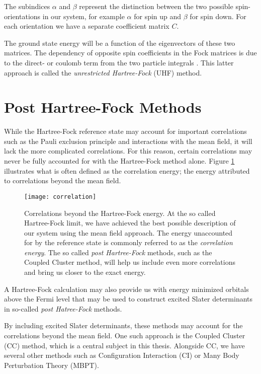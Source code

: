 The subindices $\alpha$ and $\beta$ represent the distinction between the two possible spin-orientations in our system, for example $\alpha$ for spin up and $\beta$ for spin down. For each orientation we have a separate coefficient matrix $C$.

The ground state energy will be a function of the eigenvectors of
these two matrices. The dependency of opposite spin coefficients in
the Fock matrices is due to the direct- or coulomb term from the two
particle integrals \cite[p.241]{Szabo}. This latter approach is called
the \emph{unrestricted Hartree-Fock} (UHF) method.



\section{Post Hartree-Fock Methods}

While the Hartree-Fock reference state may account for important
correlations such as the Pauli exclusion principle and interactions
with the mean field, it will lack the more complicated
correlations. For this reason, certain correlations may never be fully
accounted for with the Hartree-Fock method alone. Figure
\ref{fig:correlation} illustrates what is often defined as the
correlation energy; the energy attributed to correlations beyond the
mean field.
\begin{figure}[hbtp]
    \centering
    \texttt{[image: correlation]}
    \caption{Correlations beyond the Hartree-Fock energy. At the so
      called Hartree-Fock limit, we have achieved the best possible
      description of our system using the mean field approach. The
      energy unaccounted for by the reference state is commonly
      referred to as the \emph{correlation energy}. The so called
      \emph{post Hartree-Fock} methods, such as the Coupled Cluster
      method, will help us include even more correlations and bring us
      closer to the exact energy.}
    \label{fig:correlation}
\end{figure}

A Hartree-Fock calculation may also provide us with energy minimized
orbitals above the Fermi level that may be used to construct excited
Slater determinants in so-called \emph{post Hatree-Fock} methods.

By including excited Slater determinants, these methods may
account for the correlations beyond the mean field. One such approach is the Coupled Cluster (CC) method, which
is a central subject in this thesis. Alongside CC, we have several
other methods such as Configuration Interaction (CI) or Many Body
Perturbation Theory (MBPT).

